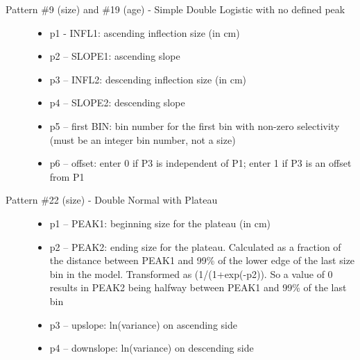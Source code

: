 \begin{description}
	\item[Pattern \#9 (size) and \#19 (age) - Simple Double Logistic with no defined peak]\hfil
	\begin{itemize}
		\item p1 - INFL1:  ascending inflection size (in cm)
		\item p2 – SLOPE1:  ascending slope
		\item p3 – INFL2:  descending inflection size (in cm)
		\item p4 – SLOPE2:  descending slope
		\item p5 – first BIN: bin number for the first bin with non-zero selectivity (must be an integer bin number, not a size)
		\item p6 – offset:  enter 0 if P3 is independent of P1; enter 1 if P3 is an offset from P1
	\end{itemize}
\end{description}

\begin{description}
	\item[Pattern \#22 (size) - Double Normal with Plateau]\hfil
	\begin{itemize}
		\item p1 – PEAK1:  beginning size for the plateau (in cm)
		\item p2 – PEAK2:  ending size for the plateau.  Calculated as a fraction of the distance between PEAK1 and 99\% of the lower edge of the last size bin in the model.  Transformed as (1/(1+exp(-p2)).   So a value of 0 results in PEAK2 being halfway between PEAK1 and 99\% of the last bin
		\item p3 – upslope:  ln(variance) on ascending side
		\item p4 – downslope:  ln(variance) on descending side
	\end{itemize}
\end{description}

